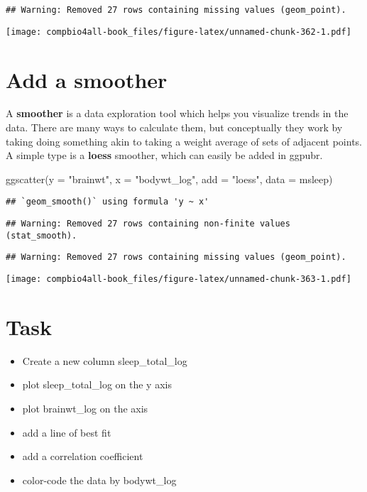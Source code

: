 \documentclass[
]{book}
\newenvironment{Shaded}{\begin{snugshade}}{\end{snugshade}}
\newcommand{\AttributeTok}[1]{\textcolor[rgb]{0.77,0.63,0.00}{#1}}
\newcommand{\FunctionTok}[1]{\textcolor[rgb]{0.00,0.00,0.00}{#1}}
\newcommand{\NormalTok}[1]{#1}
\newcommand{\StringTok}[1]{\textcolor[rgb]{0.31,0.60,0.02}{#1}}
\providecommand{\tightlist}{%
  \setlength{\itemsep}{0pt}\setlength{\parskip}{0pt}}
\begin{document}
\begin{verbatim}
## Warning: Removed 27 rows containing missing values (geom_point).
\end{verbatim}

\texttt{[image: compbio4all-book\_files/figure-latex/unnamed-chunk-362-1.pdf]}

\hypertarget{add-a-smoother}{%
\section{Add a smoother}\label{add-a-smoother}}

A \textbf{smoother} is a data exploration tool which helps you visualize trends in the data. There are many ways to calculate them, but conceptually they work by taking doing something akin to taking a weight average of sets of adjacent points. A simple type is a \textbf{loess} smoother, which can easily be added in ggpubr.

\begin{Shaded}
\begin{Highlighting}[]
\FunctionTok{ggscatter}\NormalTok{(}\AttributeTok{y =} \StringTok{"brainwt"}\NormalTok{,}
          \AttributeTok{x =} \StringTok{"bodywt\_log"}\NormalTok{,}
          \AttributeTok{add  =} \StringTok{"loess"}\NormalTok{,}
          \AttributeTok{data =}\NormalTok{ msleep)}
\end{Highlighting}
\end{Shaded}

\begin{verbatim}
## `geom_smooth()` using formula 'y ~ x'
\end{verbatim}

\begin{verbatim}
## Warning: Removed 27 rows containing non-finite values (stat_smooth).
\end{verbatim}

\begin{verbatim}
## Warning: Removed 27 rows containing missing values (geom_point).
\end{verbatim}

\texttt{[image: compbio4all-book\_files/figure-latex/unnamed-chunk-363-1.pdf]}

\hypertarget{task-1}{%
\section{Task}\label{task-1}}

\begin{itemize}
\tightlist
\item
  Create a new column sleep\_total\_log
\item
  plot sleep\_total\_log on the y axis
\item
  plot brainwt\_log on the axis
\item
  add a line of best fit
\item
  add a correlation coefficient
\item
  color-code the data by bodywt\_log
\end{itemize}
\end{document}
